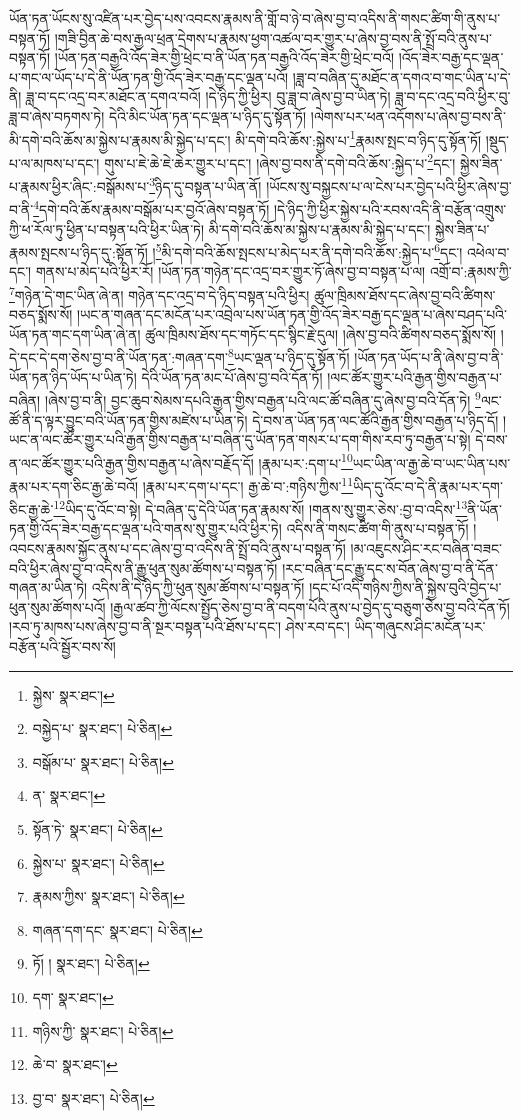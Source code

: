 ཡོན་ཏན་ཡོངས་སུ་འཛིན་པར་བྱེད་པས་འབངས་རྣམས་ནི་གློ་བ་ཉེ་བ་ཞེས་བྱ་བ་འདིས་ནི་གསང་ཚིག་གི་ནུས་པ་བསྟན་ཏོ། །གཟི་བྱིན་ཆེ་བས་རྒྱལ་ཕྲན་དྲེགས་པ་རྣམས་ཕྱག་འཚལ་བར་གྱུར་པ་ཞེས་བྱ་བས་ནི་སྤྲོ་བའི་ནུས་པ་བསྟན་ཏོ། །ཡོན་ཏན་བརྒྱའི་འོད་ཟེར་གྱི་ཕྲེང་བ་ནི་ཡོན་ཏན་བརྒྱའི་འོད་ཟེར་གྱི་ཕྲེང་བའོ། །འོད་ཟེར་བརྒྱ་དང་ལྡན་པ་གང་ལ་ཡོད་པ་དེ་ནི་ཡོན་ཏན་གྱི་འོད་ཟེར་བརྒྱ་དང་ལྡན་པའོ། །ཟླ་བ་བཞིན་དུ་མཐོང་ན་དགའ་བ་གང་ཡིན་པ་དེ་ནི། ཟླ་བ་དང་འདྲ་བར་མཐོང་ན་དགའ་བའོ། །དེ་ཉིད་ཀྱི་ཕྱིར། བུ་ཟླ་བ་ཞེས་བྱ་བ་ཡིན་ཏེ། ཟླ་བ་དང་འདྲ་བའི་ཕྱིར་བུ་ཟླ་བ་ཞེས་བཏགས་ཏེ། དེའི་མིང་ཡོན་ཏན་དང་ལྡན་པ་ཉིད་དུ་སྟོན་ཏོ། །ལེགས་པར་ཕན་འདོགས་པ་ཞེས་བྱ་བས་ནི་མི་དགེ་བའི་ཆོས་མ་སྐྱེས་པ་རྣམས་མི་སྐྱེད་པ་དང་། མི་དགེ་བའི་ཆོས་:སྐྱེས་པ་\footnote{སྐྱེས་  སྣར་ཐང་། }རྣམས་སྤང་བ་ཉིད་དུ་སྟོན་ཏོ། །སྡུད་པ་ལ་མཁས་པ་དང་། གུས་པ་ཇེ་ཆེ་ཇེ་ཆེར་གྱུར་པ་དང་། །ཞེས་བྱ་བས་ནི་དགེ་བའི་ཆོས་:སྐྱེད་པ་\footnote{བསྐྱེད་པ་  སྣར་ཐང་།  པེ་ཅིན། }དང་། སྐྱེས་ཟིན་པ་རྣམས་ཕྱིར་ཞིང་:བསྒོམས་པ་\footnote{བསྒོམ་པ་  སྣར་ཐང་།  པེ་ཅིན། }ཉིད་དུ་བསྟན་པ་ཡིན་ནོ། །ཡོངས་སུ་བསྐྱངས་པ་ལ་ངེས་པར་བྱེད་པའི་ཕྱིར་ཞེས་བྱ་བ་ནི་\footnote{ན་  སྣར་ཐང་། }དགེ་བའི་ཆོས་རྣམས་བསྒོམ་པར་བྱའོ་ཞེས་བསྟན་ཏོ། །དེ་ཉིད་ཀྱི་ཕྱིར་སྐྱེས་པའི་རབས་འདི་ནི་བརྩོན་འགྲུས་ཀྱི་ཕ་རོལ་ཏུ་ཕྱིན་པ་བསྟན་པའི་ཕྱིར་ཡིན་ཏེ། མི་དགེ་བའི་ཆོས་མ་སྐྱེས་པ་རྣམས་མི་སྐྱེད་པ་དང་། སྐྱེས་ཟིན་པ་རྣམས་སྤངས་པ་ཉིད་དུ་:སྟོན་ཏོ། །\footnote{སྟོན་ཏེ་  སྣར་ཐང་།  པེ་ཅིན། }མི་དགེ་བའི་ཆོས་སྤངས་པ་མེད་པར་ནི་དགེ་བའི་ཆོས་:སྐྱེད་པ་\footnote{སྐྱེས་པ་  སྣར་ཐང་།  པེ་ཅིན། }དང་། འཕེལ་བ་དང་། གནས་པ་མེད་པའི་ཕྱིར་རོ། །ཡོན་ཏན་གཉེན་དང་འདྲ་བར་གྱུར་ཏོ་ཞེས་བྱ་བ་བསྟན་པ་ལ། འགྲོ་བ་:རྣམས་ཀྱི་\footnote{རྣམས་ཀྱིས་  སྣར་ཐང་།  པེ་ཅིན། }གཉེན་དེ་གང་ཡིན་ཞེ་ན། གཉེན་དང་འདྲ་བ་དེ་ཉིད་བསྟན་པའི་ཕྱིར། ཚུལ་ཁྲིམས་ཐོས་དང་ཞེས་བྱ་བའི་ཚིགས་བཅད་སྨོས་སོ། །ཡང་ན་གཞན་དང་མངོན་པར་འབྲེལ་པས་ཡོན་ཏན་གྱི་འོད་ཟེར་བརྒྱ་དང་ལྡན་པ་ཞེས་བཤད་པའི་ཡོན་ཏན་གང་དག་ཡིན་ཞེ་ན། ཚུལ་ཁྲིམས་ཐོས་དང་གཏོང་དང་སྙིང་རྗེ་དུལ། །ཞེས་བྱ་བའི་ཚིགས་བཅད་སྨོས་སོ། །དེ་དང་དེ་དག་ཅེས་བྱ་བ་ནི་ཡོན་ཏན་:གཞན་དག་\footnote{གཞན་དག་དང་  སྣར་ཐང་།  པེ་ཅིན། }ཡང་ལྡན་པ་ཉིད་དུ་སྟོན་ཏོ། །ཡོན་ཏན་ཡོད་པ་ནི་ཞེས་བྱ་བ་ནི་ཡོན་ཏན་ཉིད་ཡོད་པ་ཡིན་ཏེ། དེའི་ཡོན་ཏན་མང་པོ་ཞེས་བྱ་བའི་དོན་ཏོ། །ལང་ཚོར་གྱུར་པའི་རྒྱན་གྱིས་བརྒྱན་པ་བཞིན། །ཞེས་བྱ་བ་ནི། བྱང་ཆུབ་སེམས་དཔའི་རྒྱན་གྱིས་བརྒྱན་པའི་ལང་ཚོ་བཞིན་དུ་ཞེས་བྱ་བའི་དོན་ཏེ། \footnote{ཏོ། །   སྣར་ཐང་།  པེ་ཅིན། }ལང་ཚོ་ནི་ད་ལྟར་བྱུང་བའི་ཡོན་ཏན་གྱིས་མཛེས་པ་ཡིན་ཏེ། དེ་བས་ན་ཡོན་ཏན་ལང་ཚོའི་རྒྱན་གྱིས་བརྒྱན་པ་ཉིད་དོ། །ཡང་ན་ལང་ཚོར་གྱུར་པའི་རྒྱན་གྱིས་བརྒྱན་པ་བཞིན་དུ་ཡོན་ཏན་གསར་པ་དག་གིས་རབ་ཏུ་བརྒྱན་པ་སྟེ། དེ་བས་ན་ལང་ཚོར་གྱུར་པའི་རྒྱན་གྱིས་བརྒྱན་པ་ཞེས་བརྗོད་དོ། །རྣམ་པར་:དག་པ་\footnote{དག་  སྣར་ཐང་། }ཡང་ཡིན་ལ་རྒྱ་ཆེ་བ་ཡང་ཡིན་པས་རྣམ་པར་དག་ཅིང་རྒྱ་ཆེ་བའོ། །རྣམ་པར་དག་པ་དང་། རྒྱ་ཆེ་བ་:གཉིས་ཀྱིས་\footnote{གཉིས་ཀྱི་  སྣར་ཐང་།  པེ་ཅིན། }ཡིད་དུ་འོང་བ་དེ་ནི་རྣམ་པར་དག་ཅིང་རྒྱ་ཆེ་\footnote{ཆེ་བ་  སྣར་ཐང་། }ཡིད་དུ་འོང་བ་སྟེ། དེ་བཞིན་དུ་དེའི་ཡོན་ཏན་རྣམས་སོ། །གནས་སུ་གྱུར་ཅེས་:བྱ་བ་འདིས་\footnote{བྱ་བ་  སྣར་ཐང་།  པེ་ཅིན། }ནི་ཡོན་ཏན་གྱི་འོད་ཟེར་བརྒྱ་དང་ལྡན་པའི་གནས་སུ་གྱུར་པའི་ཕྱིར་ཏེ། འདིས་ནི་གསང་ཚིག་གི་ནུས་པ་བསྟན་ཏོ། །འབངས་རྣམས་སྐྱོང་ནུས་པ་དང་ཞེས་བྱ་བ་འདིས་ནི་སྤྲོ་བའི་ནུས་པ་བསྟན་ཏོ། །མ་འཇུངས་ཤིང་རང་བཞིན་བཟང་བའི་ཕྱིར་ཞེས་བྱ་བ་འདིས་ནི་རྒྱུ་ཕུན་སུམ་ཚོགས་པ་བསྟན་ཏོ། །རང་བཞིན་དང་རྒྱུ་དང་ས་བོན་ཞེས་བྱ་བ་ནི་དོན་གཞན་མ་ཡིན་ཏེ། འདིས་ནི་དེ་ཉིད་ཀྱི་ཕུན་སུམ་ཚོགས་པ་བསྟན་ཏོ། །དང་པོ་འདི་གཉིས་ཀྱིས་ནི་སྐྱེས་བུའི་བྱེད་པ་ཕུན་སུམ་ཚོགས་པའོ། །རྒྱལ་ཚབ་ཀྱི་ལོངས་སྤྱོད་ཅེས་བྱ་བ་ནི་བདག་པོའི་ནུས་པ་བྱེད་དུ་བཅུག་ཅེས་བྱ་བའི་དོན་ཏོ། །རབ་ཏུ་མཁས་པས་ཞེས་བྱ་བ་ནི་སྔར་བསྟན་པའི་ཐོས་པ་དང་། ཤེས་རབ་དང་། ཡིད་གཞུངས་ཤིང་མངོན་པར་བརྩོན་པའི་སྦྱོར་བས་སོ། 